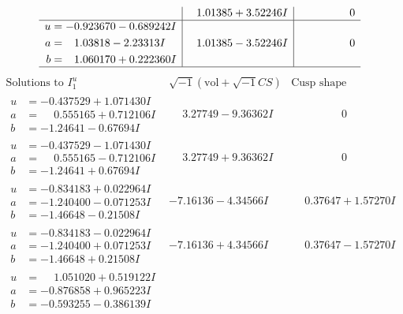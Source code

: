 \documentclass[1p]{elsarticle_modified}
\theoremstyle{definition}
\newcommand{\I}{\sqrt{-1}}
\begin{document}
$$\begin{array}{c|c|c}
 & \phantom{-}1.01385 + 3.52246 I & \phantom{-0.000000 } 0 \\ \hline\begin{aligned}
u &= -0.923670 - 0.689242 I \\
a &= \phantom{-}1.03818 - 2.23313 I \\
b &= \phantom{-}1.060170 + 0.222360 I\end{aligned}
 & \phantom{-}1.01385 - 3.52246 I & \phantom{-0.000000 } 0\\
 \hline 
 \end{array}$$\newpage$$\begin{array}{c|c|c}  
\text{Solutions to }I^u_{1}& \I (\text{vol} + \sqrt{-1}CS) & \text{Cusp shape}\\
 \hline 
\begin{aligned}
u &= -0.437529 + 1.071430 I \\
a &= \phantom{-}0.555165 + 0.712106 I \\
b &= -1.24641 - 0.67694 I\end{aligned}
 & \phantom{-}3.27749 - 9.36362 I & \phantom{-0.000000 } 0 \\ \hline\begin{aligned}
u &= -0.437529 - 1.071430 I \\
a &= \phantom{-}0.555165 - 0.712106 I \\
b &= -1.24641 + 0.67694 I\end{aligned}
 & \phantom{-}3.27749 + 9.36362 I & \phantom{-0.000000 } 0 \\ \hline\begin{aligned}
u &= -0.834183 + 0.022964 I \\
a &= -1.240400 - 0.071253 I \\
b &= -1.46648 - 0.21508 I\end{aligned}
 & -7.16136 - 4.34566 I & \phantom{-}0.37647 + 1.57270 I \\ \hline\begin{aligned}
u &= -0.834183 - 0.022964 I \\
a &= -1.240400 + 0.071253 I \\
b &= -1.46648 + 0.21508 I\end{aligned}
 & -7.16136 + 4.34566 I & \phantom{-}0.37647 - 1.57270 I \\ \hline\begin{aligned}
u &= \phantom{-}1.051020 + 0.519122 I \\
a &= -0.876858 + 0.965223 I \\
b &= -0.593255 - 0.386139 I\end{aligned}

\end{array}$$
\end{document}
